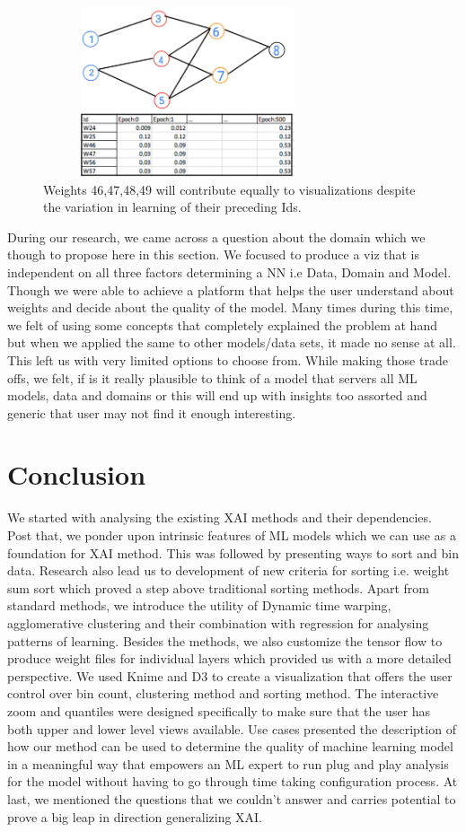 \documentclass[journal]{vgtc}                %
\begin{document}
\begin{figure}
    \includegraphics[width=8.5cm,height=5cm] {weight_rel.jpg}
    \caption{ Weights 46,47,48,49 will contribute equally to visualizations despite the variation in learning of their preceding Ids.}
    \label{weight_relations}
\end{figure}


During our research, we came across a question about the domain which we though to propose here in this section. We focused to produce a viz that is independent on all three factors determining a NN i.e Data, Domain and Model. Though we were able to achieve a platform that helps the user understand about weights and decide about the quality of the model. Many times during this time, we felt of using some concepts that completely explained the problem at hand but when we applied the same to other models/data sets, it made no sense at all. This left us with very limited options to choose from. While making those trade offs, we felt, if is it really plausible to think of a model that servers all ML models, data and domains or this will end up with insights too assorted and generic that user may not find it enough interesting.


\section{Conclusion}
We started with analysing the existing XAI methods and their dependencies.
Post that, we ponder upon intrinsic features of ML models 
which we can use as a foundation for XAI method.
This was followed by presenting ways to sort and bin data. 
Research also lead us to  development of new criteria for sorting i.e. weight sum sort which proved a step above traditional sorting methods.
Apart from standard methods, we introduce the utility  of 
Dynamic time warping, agglomerative clustering and their combination with regression 
for analysing patterns of learning.
Besides the methods, we also customize the tensor flow to produce weight files for individual layers 
which provided us with a more detailed perspective.
We used Knime and D3  to create a visualization that offers the user control over bin count, clustering method and sorting method. 
The interactive zoom and quantiles were designed specifically to make sure that the user has both upper and lower level views available.
Use cases presented the description of how our method can be used to determine the quality of machine learning model
in a meaningful way that empowers an ML expert to run plug and play analysis for the model without 
having to go through time taking configuration process. 
At last, we mentioned the questions that we couldn't answer and carries potential 
to prove a big leap in direction generalizing XAI.



\end{document}
